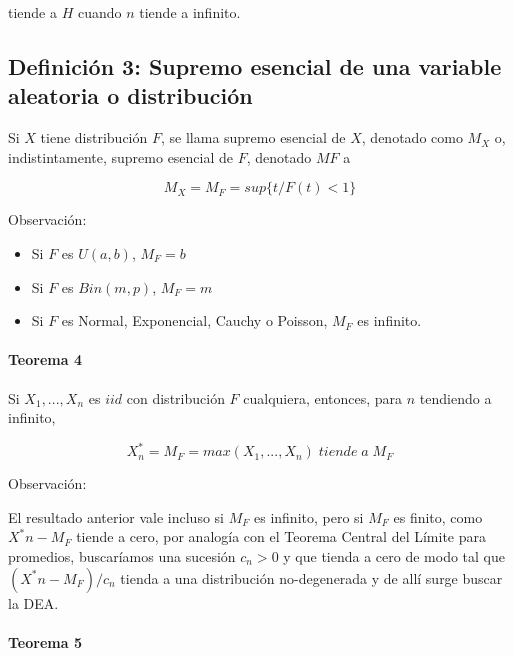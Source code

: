 \documentclass[
]{book}
\theoremstyle{definition}
\theoremstyle{definition}
\theoremstyle{definition}
\theoremstyle{definition}
\theoremstyle{remark}
\begin{document}
tiende a \(H\) cuando \(n\) tiende a infinito.

\subsection{Definición 3: Supremo esencial de una variable aleatoria o distribución}\label{definiciuxf3n-3-supremo-esencial-de-una-variable-aleatoria-o-distribuciuxf3n}

Si \(X\) tiene distribución \(F\), se llama supremo esencial de \(X\), denotado como \(M_X\) o, indistintamente, supremo esencial de \(F\), denotado \(MF\) a

\begin{equation}
M_X=M_F= sup\{t / F(t)<1\}\label{eq:Mx}
\end{equation}

Observación:

\begin{itemize}
\item Si $F$ es $U(a,b)$, $M_F=b$
\item Si $F$ es $Bin(m,p)$, $M_F=m$
\item Si $F$ es Normal, Exponencial, Cauchy o Poisson, $M_F$ es infinito.
\end{itemize}

\paragraph{Teorema 4}\label{teorema-4}

Si \(X_1,...,X_n\) es \(iid\) con distribución \(F\) cualquiera, entonces, para \(n\) tendiendo a infinito,

\begin{equation}
X^*_n=M_F= max(X_1,...,X_n)\;tiende\;a\;M_F\label{eq:Xast}
\end{equation}

Observación:

El resultado anterior vale incluso si \(M_F\) es infinito, pero si \(M_F\) es finito, como \(X^*n - M_F\) tiende a cero, por analogía con el Teorema Central del Límite para promedios, buscaríamos una sucesión \(c_n>0\) y que tienda a cero de modo tal que \((X^*n- M_F )/ c_n\) tienda a una distribución no-degenerada y de allí surge buscar la DEA.

\paragraph{Teorema 5}\label{teorema-5}
\end{document}
